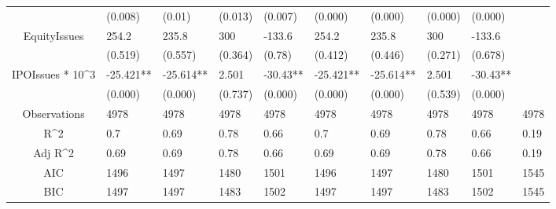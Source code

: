 \documentclass{article}
\begin{document}
\begin{table}[H]
\begin{tabular}{|clllllllll|}
   & (0.008) & (0.01) & (0.013) & (0.007) & (0.000) & (0.000) & (0.000) & (0.000) &  \\ 
  EquityIssues & 254.2 & 235.8 & 300 & -133.6 & 254.2 & 235.8 & 300 & -133.6 &  \\ 
   & (0.519) & (0.557) & (0.364) & (0.78) & (0.412) & (0.446) & (0.271) & (0.678) &  \\ 
  IPOIssues * 10^3 & -25.421** & -25.614** & 2.501 & -30.43** & -25.421** & -25.614** & 2.501 & -30.43** &  \\ 
   & (0.000) & (0.000) & (0.737) & (0.000) & (0.000) & (0.000) & (0.539) & (0.000) &  \\ 
  \hline 
 Observations & 4978 & 4978 & 4978 & 4978 & 4978 & 4978 & 4978 & 4978 & 4978 \\ 
  R^2 & 0.7 & 0.69 & 0.78 & 0.66 & 0.7 & 0.69 & 0.78 & 0.66 & 0.19 \\ 
  Adj R^2 & 0.69 & 0.69 & 0.78 & 0.66 & 0.69 & 0.69 & 0.78 & 0.66 & 0.19 \\ 
  AIC & 1496 & 1497 & 1480 & 1501 & 1496 & 1497 & 1480 & 1501 & 1545 \\ 
  BIC & 1497 & 1497 & 1483 & 1502 & 1497 & 1497 & 1483 & 1502 & 1545 \\ 
   \hline
\end{tabular}
 
\end{table}
\end{document}
